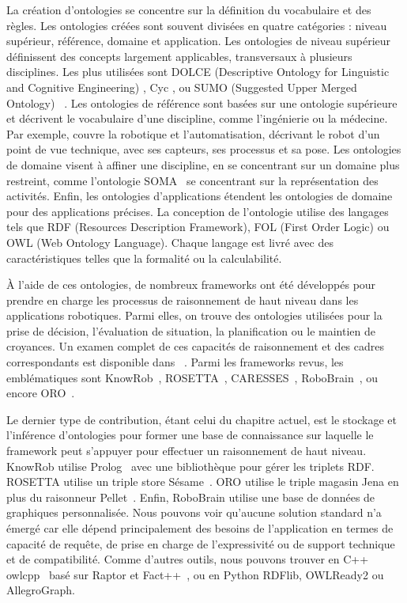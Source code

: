 La création d'ontologies se concentre sur la définition du vocabulaire et des règles. Les ontologies créées sont souvent divisées en quatre catégories : niveau supérieur, référence, domaine et application. Les ontologies de niveau supérieur définissent des concepts largement applicables, transversaux à plusieurs disciplines. Les plus utilisées sont DOLCE (Descriptive Ontology for Linguistic and Cognitive Engineering) \cite{masolo_2003_dolce}, Cyc \cite{lenat_1989_building}, ou SUMO (Suggested Upper Merged Ontology) ~\cite{niles_2001_towards}. Les ontologies de référence sont basées sur une ontologie supérieure et décrivent le vocabulaire d'une discipline, comme l'ingénierie ou la médecine. Par exemple, \cite{schlenoff_2015_ieee} couvre la robotique et l'automatisation, décrivant le robot d'un point de vue technique, avec ses capteurs, ses processus et sa pose. Les ontologies de domaine visent à affiner une discipline, en se concentrant sur un domaine plus restreint, comme l'ontologie SOMA~\cite{bessler_2020_foundations} se concentrant sur la représentation des activités. Enfin, les ontologies d'applications étendent les ontologies de domaine pour des applications précises. La conception de l'ontologie utilise des langages tels que RDF (Resources Description Framework), FOL (First Order Logic) ou OWL (Web Ontology Language). Chaque langage est livré avec des caractéristiques telles que la formalité ou la calculabilité.

À l'aide de ces ontologies, de nombreux frameworks ont été développés pour prendre en charge les processus de raisonnement de haut niveau dans les applications robotiques. Parmi elles, on trouve des ontologies utilisées pour la prise de décision, l'évaluation de situation, la planification ou le maintien de croyances. Un examen complet de ces capacités de raisonnement et des cadres correspondants est disponible dans ~\cite{olivares_2019_review}. Parmi les frameworks revus, les emblématiques sont KnowRob~\cite{tenorth_2013_knowrob}, ROSETTA~\cite{stenmark_2013_knowledge}, CARESSES~\cite{bruno_2017_caresses}, RoboBrain~\cite{saxena_2014_robobrain}, ou encore ORO~\cite{lemaignan_2010}.

Le dernier type de contribution, étant celui du chapitre actuel, est le stockage et l'inférence d'ontologies pour former une base de connaissance sur laquelle le framework peut s'appuyer pour effectuer un raisonnement de haut niveau. KnowRob utilise Prolog~\cite{wielemaker_2003_prolog} avec une bibliothèque pour gérer les triplets RDF. ROSETTA utilise un triple store Sésame~\cite{broekstra_2002_sesame}. ORO utilise le triple magasin Jena en plus du raisonneur Pellet~\cite{sirin_2007_pellet}. Enfin, RoboBrain utilise une base de données de graphiques personnalisée. Nous pouvons voir qu'aucune solution standard n'a émergé car elle dépend principalement des besoins de l'application en termes de capacité de requête, de prise en charge de l'expressivité ou de support technique et de compatibilité. Comme d'autres outils, nous pouvons trouver en C++ owlcpp~\cite{levin_2011_owl} basé sur Raptor et Fact++~\cite{tsarkov_2006_fact}, ou en Python RDFlib, OWLReady2 ou AllegroGraph. 


